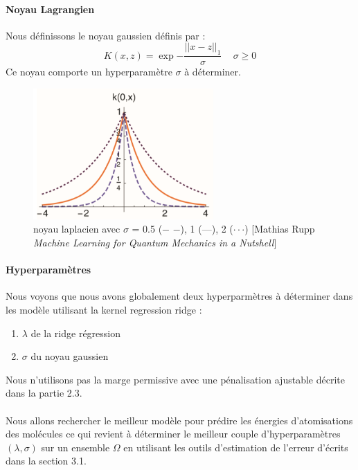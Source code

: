 \documentclass[a4paper,12pt,titlepage]{report}
\begin{document}
\paragraph{Noyau Lagrangien}
Nous définissons le noyau gaussien définis par :
\[ 
	K(x,z) = \exp{- \frac{||x-z||_{1}}{\sigma}} \, \quad \sigma \geqslant 0 
\]
Ce noyau comporte un hyperparamètre $\sigma$ à déterminer.
\begin{figure}[!h]
	\begin{center}
		\includegraphics[height = 5cm, keepaspectratio]{graphes/noyaux_laplacien.png}
		\caption{noyau laplacien avec $\sigma$ = 0.5 ($-$ $-$), 1 (---), 2 ($\cdot\cdot\cdot$) [Mathias Rupp \textit{Machine Learning for Quantum Mechanics in a Nutshell}]}
	\end{center}
\end{figure}

\paragraph{Hyperparamètres}
Nous voyons que nous avons globalement deux hyperparmètres à déterminer dans  les modèle utilisant la kernel regression ridge :
\begin{enumerate}
 	\item $\lambda$ de la ridge régression
    \item $\sigma$ du noyau gaussien
\end{enumerate}
Nous n'utilisons pas la marge permissive avec une pénalisation ajustable décrite dans la partie 2.3.
\paragraph{}
Nous allons rechercher le meilleur modèle pour prédire les énergies d'atomisations des molécules ce qui revient à déterminer le meilleur couple d'hyperparamètres $(\lambda, \sigma)$ sur un ensemble $\Omega$ en utilisant les outils d'estimation de l'erreur d'écrits dans la section 3.1. 
\end{document}

